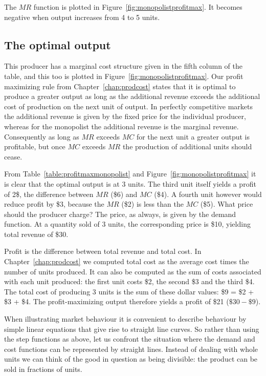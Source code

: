 The $MR$ function is plotted in Figure~\ref{fig:monopolistprofitmax}. It becomes negative when output increases from 4 to 5 units.


 
\subsection*{The optimal output}

This producer has a marginal cost structure given in the fifth column of the table, and this too is plotted in Figure~\ref{fig:monopolistprofitmax}. Our profit maximizing rule from Chapter~\ref{chap:prodcost} states that it is optimal to produce a greater output as long as the additional revenue exceeds the additional cost of production on the next unit of output. In perfectly competitive markets the additional revenue is given by the fixed price for the individual producer, whereas for the monopolist the additional revenue is the marginal revenue. Consequently as long as $MR$ exceeds $MC$ for the next unit a greater output is profitable, but once $MC$ exceeds $MR$ the production of additional units should cease.

From Table~\ref{table:profitmaxmonopolist} and Figure~\ref{fig:monopolistprofitmax} it is clear that the optimal output is at 3 units. The third unit itself yields a profit of 2\$, the difference between $MR$ (\$6) and $MC$ (\$4).  A fourth unit however would reduce profit by \$3, because the $MR$ (\$2) is less than the $MC$ (\$5). What price should the producer charge? The price, as always, is given by the demand function. At a quantity sold of 3 units, the corresponding price is \$10, yielding total revenue of \$30. 

Profit is the difference between total revenue and total cost. In Chapter~\ref{chap:prodcost} we computed total cost as the average cost times the number of units produced. It can also be computed as the sum of costs associated with each unit produced: the first unit costs \$2, the second \$3 and the third \$4. The total cost of producing 3 units is the sum of these dollar values: \$9 = \$2 + \$3 + \$4. The profit-maximizing output therefore yields a profit of \$21 ($\$30-\$9$). 

When illustrating market behaviour it is convenient to describe behaviour by simple linear equations that give rise to straight line curves. So rather than using the step functions as above, let us confront the situation where the demand and cost functions can be represented by straight lines. Instead of dealing with whole units we can think of the good in question as being divisible: the product can be sold in fractions of units. 

